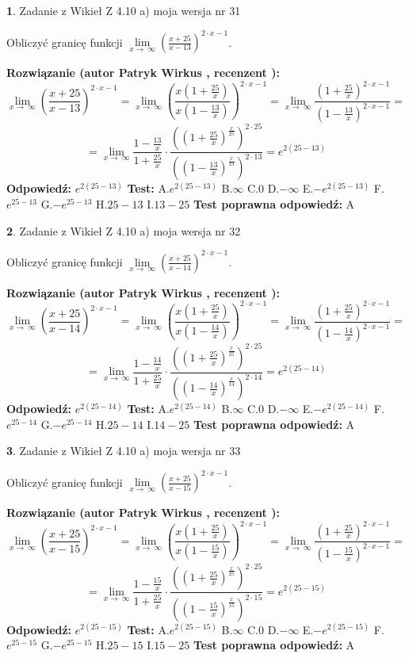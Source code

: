 \documentclass[12pt, a4paper]{article}
\theoremstyle{definition} %
\newtheorem{zad}{}
\newcommand{\zadStart}[1]{\begin{zad}#1\newline}
\newcommand{\zadStop}{\end{zad}}
\newcommand{\rozwStart}[2]{\noindent \textbf{Rozwiązanie (autor #1 , recenzent #2): }\newline}
\newcommand{\rozwStop}{\newline}
\newcommand{\odpStart}{\noindent \textbf{Odpowiedź:}\newline}
\newcommand{\odpStop}{\newline}
\newcommand{\testStart}{\noindent \textbf{Test:}\newline}
\newcommand{\testStop}{\newline}
\newcommand{\kluczStart}{\noindent \textbf{Test poprawna odpowiedź:}\newline}
\newcommand{\kluczStop}{\newline}
\begin{document}
\zadStart{Zadanie z Wikieł Z 4.10 a) moja wersja nr 31}


Obliczyć granicę funkcji  $\lim\limits_{x\to\ \infty}(\frac{x+25}{x-13})^{2\cdot x-1}$.
\zadStop
\rozwStart{Patryk Wirkus}{}
$$\lim\limits_{x\to\ \infty}(\frac{x+25}{x-13})^{2\cdot x-1} = \lim\limits_{x\to\ \infty}(\frac{x(1+\frac{25}{x})}{x(1-\frac{13}{x})})^{2\cdot x-1}=\lim\limits_{x\to\ \infty}\frac{(1+\frac{25}{x})^{2\cdot x-1}}{(1-\frac{13}{x})^{2\cdot x-1}}=$$
$$=\lim\limits_{x\to\ \infty}\frac{1-\frac{13}{x}}{1+\frac{25}{x}}\cdot\frac{((1+\frac{25}{x})^{\frac{x}{25}})^{2\cdot25}}{((1-\frac{13}{x})^{\frac{x}{13}})^{2\cdot13}}=e^{2(25-13)}$$
\rozwStop
\odpStart
$e^{2(25-13)}$
\odpStop
\testStart
A.$e^{2(25-13)}$ B.$\infty$ C.$0$ D.$-\infty$ E.$-e^{2(25-13)}$
F.$e^{25-13}$ G.$-e^{25-13}$
H.$25-13$
I.$13-25$
\testStop
\kluczStart
A
\kluczStop



\zadStart{Zadanie z Wikieł Z 4.10 a) moja wersja nr 32}


Obliczyć granicę funkcji  $\lim\limits_{x\to\ \infty}(\frac{x+25}{x-14})^{2\cdot x-1}$.
\zadStop
\rozwStart{Patryk Wirkus}{}
$$\lim\limits_{x\to\ \infty}(\frac{x+25}{x-14})^{2\cdot x-1} = \lim\limits_{x\to\ \infty}(\frac{x(1+\frac{25}{x})}{x(1-\frac{14}{x})})^{2\cdot x-1}=\lim\limits_{x\to\ \infty}\frac{(1+\frac{25}{x})^{2\cdot x-1}}{(1-\frac{14}{x})^{2\cdot x-1}}=$$
$$=\lim\limits_{x\to\ \infty}\frac{1-\frac{14}{x}}{1+\frac{25}{x}}\cdot\frac{((1+\frac{25}{x})^{\frac{x}{25}})^{2\cdot25}}{((1-\frac{14}{x})^{\frac{x}{14}})^{2\cdot14}}=e^{2(25-14)}$$
\rozwStop
\odpStart
$e^{2(25-14)}$
\odpStop
\testStart
A.$e^{2(25-14)}$ B.$\infty$ C.$0$ D.$-\infty$ E.$-e^{2(25-14)}$
F.$e^{25-14}$ G.$-e^{25-14}$
H.$25-14$
I.$14-25$
\testStop
\kluczStart
A
\kluczStop



\zadStart{Zadanie z Wikieł Z 4.10 a) moja wersja nr 33}


Obliczyć granicę funkcji  $\lim\limits_{x\to\ \infty}(\frac{x+25}{x-15})^{2\cdot x-1}$.
\zadStop
\rozwStart{Patryk Wirkus}{}
$$\lim\limits_{x\to\ \infty}(\frac{x+25}{x-15})^{2\cdot x-1} = \lim\limits_{x\to\ \infty}(\frac{x(1+\frac{25}{x})}{x(1-\frac{15}{x})})^{2\cdot x-1}=\lim\limits_{x\to\ \infty}\frac{(1+\frac{25}{x})^{2\cdot x-1}}{(1-\frac{15}{x})^{2\cdot x-1}}=$$
$$=\lim\limits_{x\to\ \infty}\frac{1-\frac{15}{x}}{1+\frac{25}{x}}\cdot\frac{((1+\frac{25}{x})^{\frac{x}{25}})^{2\cdot25}}{((1-\frac{15}{x})^{\frac{x}{15}})^{2\cdot15}}=e^{2(25-15)}$$
\rozwStop
\odpStart
$e^{2(25-15)}$
\odpStop
\testStart
A.$e^{2(25-15)}$ B.$\infty$ C.$0$ D.$-\infty$ E.$-e^{2(25-15)}$
F.$e^{25-15}$ G.$-e^{25-15}$
H.$25-15$
I.$15-25$
\testStop
\kluczStart
A
\kluczStop
\end{document}
